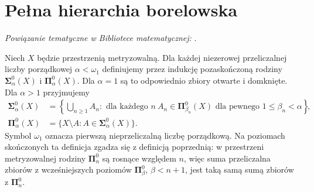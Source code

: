 \section{Pełna hierarchia borelowska}
\label{sec:topog-polskie-hierarchia-pozaskonczona}

\noindent\emph{Powiązanie tematyczne w Bibliotece matematycznej:} .


\begin{definicja}
\label{def:topog-polskie-hierarchia-porzadkowa}
Niech $X$ będzie przestrzenią
metryzowalną. Dla każdej
niezerowej przeliczalnej
liczby porządkowej
$\alpha<\omega_1$
definiujemy przez indukcję
pozaskończoną rodziny
$\boldsymbol\Sigma^0_\alpha(X)$
i $\boldsymbol\Pi^0_\alpha(X)$.
Dla $\alpha=1$ są to
odpowiednio zbiory otwarte
i domknięte. Dla $\alpha>1$
przyjmujemy
\[
\begin{aligned}
\boldsymbol\Sigma^0_\alpha(X)
&=\left\{\bigcup_{n\ge1}A_n:
\text{ dla każdego }n\
A_n\in\boldsymbol\Pi^0_{\beta_n}(X)
\text{ dla pewnego }1\le\beta_n<\alpha
\right\},\\
\boldsymbol\Pi^0_\alpha(X)
&=\{X\setminus A:
A\in\boldsymbol\Sigma^0_\alpha(X)\}.
\end{aligned}
\]
Symbol $\omega_1$ oznacza
pierwszą nieprzeliczalną
liczbę porządkową.
Na poziomach skończonych
ta definicja zgadza się
z definicją poprzednią:
w przestrzeni metryzowalnej
rodziny $\boldsymbol\Pi^0_n$
są rosnące względem $n$,
więc suma przeliczalna
zbiorów z wcześniejszych
poziomów $\boldsymbol\Pi^0_\beta$,
$\beta<n+1$, jest taką samą
sumą zbiorów z
$\boldsymbol\Pi^0_n$.
\end{definicja}

